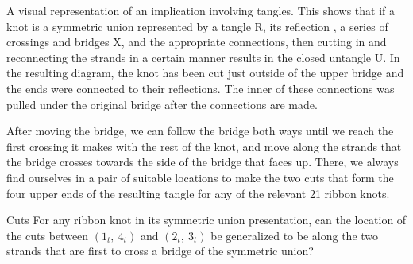 \begin{paper}
{A visual representation of an implication involving tangles.
This shows that if a knot is a symmetric union represented by a tangle R, its
reflection \usebox{\knotR}, a series of crossings and bridges X, and the
appropriate connections, then cutting in and reconnecting the strands in a
certain manner results in the closed untangle U.
In the resulting diagram, the knot has been cut just outside of the upper bridge
and the ends were connected to their reflections.
The inner of these connections was pulled under the original bridge after the
connections are made.}

After moving the bridge, we can follow the bridge both ways until we reach the
first crossing it makes with the rest of the knot, and move along the strands
that the bridge crosses towards the side of the bridge that faces up.
There, we always find ourselves in a pair of suitable locations to make the two
cuts that form the four upper ends of the resulting tangle for any of the
relevant 21 ribbon knots.

\begin{paperqtn}{Cuts}
For any ribbon knot in its symmetric union presentation, can the location of the
cuts between $(1_t,~4_t)$ and $(2_t,~3_t)$ be generalized to be along the
two strands that are first to cross a bridge of the symmetric union?
\end{paperqtn}


\end{paper}
